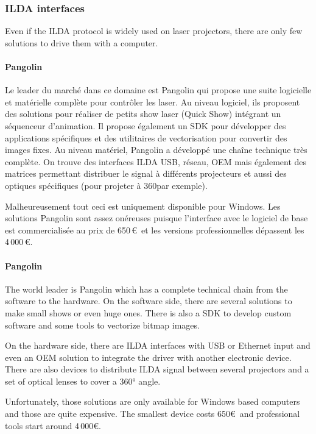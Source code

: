 \begin{en}
\subsubsection{ILDA interfaces}
\label{sec:interfaces_ILDA}
Even if the ILDA protocol is widely used on laser projectors, there are only few solutions to drive them with a computer.
\end{en}

\begin{fr}
\paragraph*{Pangolin} Le leader du marché dans ce domaine est Pangolin qui propose une suite logicielle et matérielle complète pour contrôler les laser.
Au niveau logiciel, ils proposent des solutions pour réaliser de petits show laser (Quick Show) intégrant un séquenceur d'animation. 
Il propose également un SDK pour développer des applications spécifiques et des utilitaires de vectorisation pour convertir des images fixes.
Au niveau matériel, Pangolin a développé une chaîne technique très complète. On trouve des interfaces ILDA USB, réseau, OEM mais également des matrices permettant distribuer le signal à différents projecteurs et aussi des optiques spécifiques (pour projeter à 360\degres par exemple).

Malheureusement tout ceci est uniquement disponible pour Windows. 
Les solutions Pangolin sont assez onéreuses puisque l'interface avec le logiciel de base est commercialisée au prix de 650\,\euro\ et les versions professionnelles dépassent les 4\,000\,\euro .
\end{fr}

\begin{en}
\paragraph*{Pangolin} The world leader is Pangolin which has a complete technical chain from the software to the hardware.
On the software side, there are several solutions to make small shows or even huge ones.
There is also a SDK to develop custom software and some tools to vectorize bitmap images.

On the hardware side, there are ILDA interfaces with USB or Ethernet input and even an OEM solution to integrate the driver with another electronic device.
There are also devices to distribute ILDA signal between several projectors and a set of optical lenses to cover a 360° angle.

Unfortunately, those solutions are only available for Windows based computers and those are quite expensive.
The smallest device costs 650\euro\ and professional tools start around 4\,000\euro .
\end{en}

